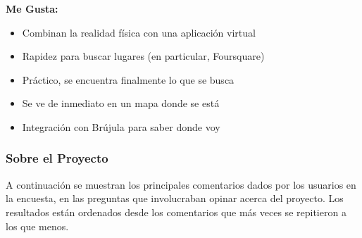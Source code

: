 \documentclass[10pt,letterpaper]{article}
\begin{document}
\textbf{Me Gusta:}\\

\begin{itemize}
\item Combinan la realidad física con una aplicación virtual
\item Rapidez para buscar lugares (en particular, Foursquare)
\item Práctico, se encuentra finalmente lo que se busca
\item Se ve de inmediato en un mapa donde se está
\item Integración con Brújula para saber donde voy
\end{itemize}

\subsubsection{Sobre el Proyecto}

A continuación se muestran los principales comentarios dados por los usuarios en la encuesta, en las preguntas que involucraban opinar acerca del proyecto. Los resultados están ordenados desde los comentarios que más veces se repitieron a los que menos.\\
\end{document}
